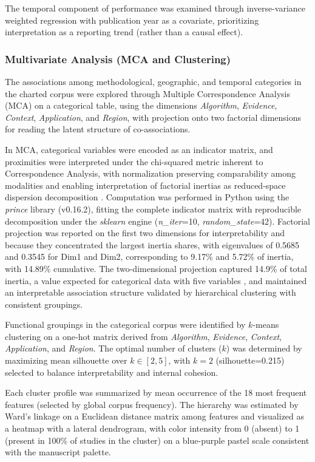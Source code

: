 \documentclass[lineno,pdflatex,sn-apa]{sn-jnl}
\begin{document}
The temporal component of performance was examined through inverse-variance weighted regression with publication year as a covariate, prioritizing interpretation as a reporting trend (rather than a causal effect).

\subsubsection{Multivariate Analysis (MCA and Clustering)}

The associations among methodological, geographic, and temporal categories in the charted corpus were explored through Multiple Correspondence Analysis (MCA) on a categorical table, using the dimensions \textit{Algorithm}, \textit{Evidence}, \textit{Context}, \textit{Application}, and \textit{Region}, with projection onto two factorial dimensions for reading the latent structure of co-associations.

In MCA, categorical variables were encoded as an indicator matrix, and proximities were interpreted under the chi-squared metric inherent to Correspondence Analysis, with normalization preserving comparability among modalities and enabling interpretation of factorial inertias as reduced-space dispersion decomposition \citep{Greenacre2017,Abdi2014}. Computation was performed in Python using the \textit{prince} library (v0.16.2), fitting the complete indicator matrix with reproducible decomposition under the \textit{sklearn} engine (\textit{n\_iter}=10, \textit{random\_state}=42). Factorial projection was reported on the first two dimensions for interpretability and because they concentrated the largest inertia shares, with eigenvalues of 0.5685 and 0.3545 for Dim1 and Dim2, corresponding to 9.17\% and 5.72\% of inertia, with 14.89\% cumulative. The two-dimensional projection captured 14.9\% of total inertia, a value expected for categorical data with five variables \citep{Greenacre2017}, and maintained an interpretable association structure validated by hierarchical clustering with consistent groupings.

Functional groupings in the categorical corpus were identified by $k$-means clustering on a one-hot matrix derived from \textit{Algorithm}, \textit{Evidence}, \textit{Context}, \textit{Application}, and \textit{Region}. The optimal number of clusters ($k$) was determined by maximizing mean silhouette over $k \in [2, 5]$, with $k=2$ (silhouette=0.215) selected to balance interpretability and internal cohesion.

Each cluster profile was summarized by mean occurrence of the 18 most frequent features (selected by global corpus frequency). The hierarchy was estimated by Ward's linkage on a Euclidean distance matrix among features and visualized as a heatmap with a lateral dendrogram, with color intensity from 0 (absent) to 1 (present in 100\% of studies in the cluster) on a blue-purple pastel scale consistent with the manuscript palette.
\end{document}
